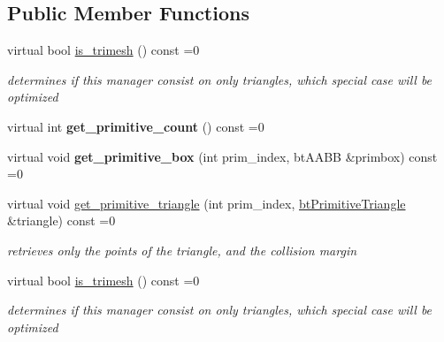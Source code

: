 \subsection*{Public Member Functions}
\begin{DoxyCompactItemize}
\item 
\mbox{\label{classbtPrimitiveManagerBase_a7dce7dd350286219d9adddefa20394f9}} 
virtual bool \hyperlink{classbtPrimitiveManagerBase_a7dce7dd350286219d9adddefa20394f9}{is\+\_\+trimesh} () const =0
\begin{DoxyCompactList}\small\item\em determines if this manager consist on only triangles, which special case will be optimized \end{DoxyCompactList}\item 
\mbox{\label{classbtPrimitiveManagerBase_a9799cc93c1cf51471d22c5295f276ae8}} 
virtual int {\bfseries get\+\_\+primitive\+\_\+count} () const =0
\item 
\mbox{\label{classbtPrimitiveManagerBase_ac826409d978724f266d4e3453118de4e}} 
virtual void {\bfseries get\+\_\+primitive\+\_\+box} (int prim\+\_\+index, bt\+A\+A\+BB \&primbox) const =0
\item 
\mbox{\label{classbtPrimitiveManagerBase_a2eb95b960e4259da38c5ee4ac080fdf7}} 
virtual void \hyperlink{classbtPrimitiveManagerBase_a2eb95b960e4259da38c5ee4ac080fdf7}{get\+\_\+primitive\+\_\+triangle} (int prim\+\_\+index, \hyperlink{classbtPrimitiveTriangle}{bt\+Primitive\+Triangle} \&triangle) const =0
\begin{DoxyCompactList}\small\item\em retrieves only the points of the triangle, and the collision margin \end{DoxyCompactList}\item 
\mbox{\label{classbtPrimitiveManagerBase_a7dce7dd350286219d9adddefa20394f9}} 
virtual bool \hyperlink{classbtPrimitiveManagerBase_a7dce7dd350286219d9adddefa20394f9}{is\+\_\+trimesh} () const =0
\begin{DoxyCompactList}\small\item\em determines if this manager consist on only triangles, which special case will be optimized \end{DoxyCompactList}\item 

\end{DoxyCompactItemize}
